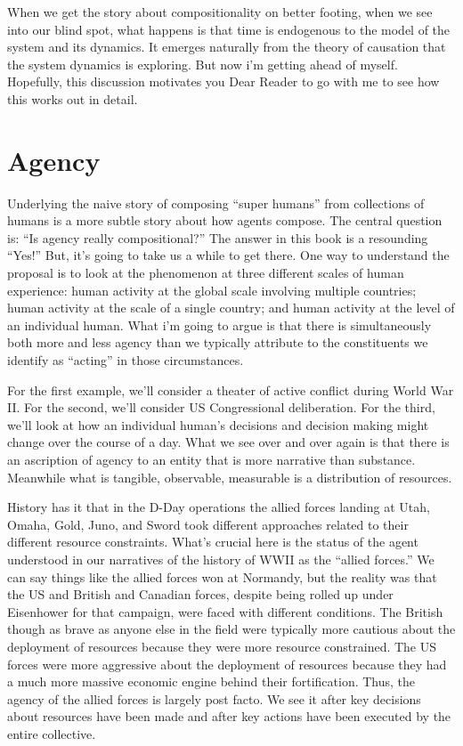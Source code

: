 When we get the story about compositionality on better footing, when we see into our blind spot, what happens is that time is endogenous to the model of the system and its dynamics. It emerges naturally from the theory of causation that the system dynamics is exploring. But now i'm getting ahead of myself. Hopefully, this discussion motivates you Dear Reader to go with me to see how this works out in detail.

\section{Agency}
\label{sec:pledge-ii}

Underlying the naive story of composing ``super humans'' from collections of humans is a more subtle story about how agents compose. The central question is: ``Is agency really compositional?'' The answer in this book is a resounding ``Yes!'' But, it's going to take us a while to get there. One way to understand the proposal is to look at the phenomenon at three different scales of human experience: human activity at the global scale involving multiple countries; human activity at the scale of a single country; and human activity at the level of an individual human. What i'm going to argue is that there is simultaneously both more and less agency than we typically attribute to the constituents we identify as ``acting'' in those circumstances.

For the first example, we'll consider a theater of active conflict during World War II. For the second, we'll consider US Congressional deliberation. For the third, we'll look at how an individual human's decisions and decision making might change over the course of a day. What we see over and over again is that there is an ascription of agency to an entity that is more narrative than substance. Meanwhile what is tangible, observable, measurable is a distribution of resources.

History has it that in the D-Day operations the allied forces landing at Utah, Omaha, Gold, Juno, and Sword took different approaches related to their different resource constraints. What's crucial here is the status of the agent understood in our narratives of the history of WWII as the ``allied forces.'' We can say things like the allied forces won at Normandy, but the reality was that the US and British and Canadian forces, despite being rolled up under Eisenhower for that campaign, were faced with different conditions. The British though as brave as anyone else in the field were typically more cautious about the deployment of resources because they were more resource constrained. The US forces were more aggressive about the deployment of resources because they had a much more massive economic engine behind their fortification. Thus, the agency of the allied forces is largely post facto. We see it after key decisions about resources have been made and after key actions have been executed by the entire collective.

